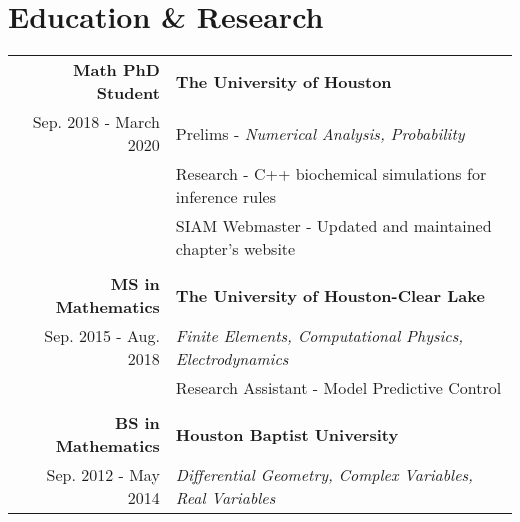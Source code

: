 \section*{\color{Blue}Education \& Research\vspace{0.5mm}{\color{Orange}\hrule}}

\begin{tabular}{ r | l }
\bf Math PhD Student            &\bf The University of Houston\\
Sep. 2018 - March 2020          &Prelims - \textit{Numerical Analysis, Probability}\\
                                &Research - C++ biochemical simulations for inference rules\\
                                &SIAM Webmaster - Updated and maintained chapter's website\\
\\
\bf MS in Mathematics           &\bf The University of Houston-Clear Lake\\
Sep. 2015 - Aug. 2018           &\textit{Finite Elements, Computational Physics, Electrodynamics}\\
                                &Research Assistant - Model Predictive Control\\
\\
\bf BS in Mathematics           &\bf Houston Baptist University\\
Sep. 2012 - May 2014            &\textit{Differential Geometry, Complex Variables, Real Variables}
\end{tabular}